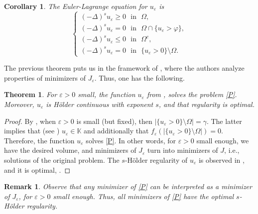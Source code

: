 \documentclass[11pt, reqno]{amsart}
\newtheorem{theorem}{Theorem}
\newtheorem{corollary}{Corollary}
\newtheorem{remark}{Remark}
\numberwithin{equation}{section}
\numberwithin{theorem}{section}
\numberwithin{lemma}{section}
\numberwithin{corollary}{section}
\numberwithin{remark}{section}
\numberwithin{proposition}{section}
\numberwithin{definition}{section}
\newcommand{\e}{\varepsilon}
\begin{document}
\begin{corollary}\label{c5.1}
	The Euler-Lagrange equation for $u_\e$ is 
	\[ \begin{cases}
	(-\Delta)^su_\e \ge 0\,\,\text{ in }\,\,\Omega,\\
	(-\Delta)^su_\e=0\,\,\text{ in }\,\,\Omega\cap\{u_\e>\varphi\},\\
	(-\Delta)^su_\e \le 0\,\,\text{ in }\,\,\Omega^c,\\
	(-\Delta)^su_\e=0\,\,\text{ in }\,\,\{u_\e>0\}\setminus\Omega.
	\end{cases} \]
	\end{corollary}
The previous theorem puts us in the framework of \cite{TT15}, where the authors analyze properties of minimizers of $J_\e$. Thus, one has the following.
\begin{theorem}\label{t5.2}
For $\varepsilon>0$ small, the function $u_\varepsilon$ from , solves the problem \eqref{P}. Moreover, $u_\e$ is H\"older continuous with exponent $s$, and that regularity is optimal.
\end{theorem}
\begin{proof}
	By , when $\e>0$ is small (but fixed), then $|\{u_\varepsilon>0\}\setminus\Omega|=\gamma$. The latter implies that (see ) $u_\e\in\mathbb{K}$ and additionally that $f_\varepsilon(|\{u_\varepsilon>0\}\setminus\Omega|)=0$. Therefore, the function $u_\varepsilon$ solves \eqref{P}. In other words, for $\e>0$ small enough, we have the desired volume, and minimizers of $J_\e$ turn into minimizers of $J$, i.e., solutions of the original problem. The $s$-H\"older regularity of $u_\e$ is observed in , and it is optimal, \cite[Theorem 2.1]{TT15}.
\end{proof}
\begin{remark}
	Observe that any minimizer of \eqref{P} can be interpreted as a minimizer of $J_{\varepsilon}$, for $\varepsilon > 0$ small enough. Thus, all minimizers of \eqref{P} have the optimal $s$-H\"older regularity.
\end{remark}

\smallskip
\end{document}
